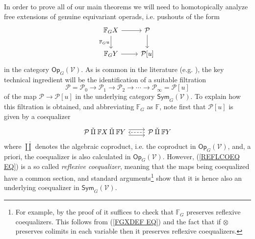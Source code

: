 \documentclass[a4paper,10pt]{article}%
\begin{document}
In order to prove all of our main theorems
we will need to homotopically analyze free extensions 
of genuine equivariant operads,
i.e. pushouts of the form
\begin{equation}
  \label{FREE_FG_EXT_EQ}
  \begin{tikzcd}
    \mathbb{F}_G X \ar{r} \ar{d}[swap]{\mathbb{F}_G u} & \mathcal{P} \ar{d}
    \\
    \mathbb{F}_G Y \ar{r} & \mathcal{P}[u]
  \end{tikzcd}
\end{equation}
in the category $\mathsf{Op}_G(\mathcal{V})$.
As is common in the literature (e.g. \cite{SS00, Spi01, BM03, Whi14, Pe16}),
the key technical ingredient will be the identification of a suitable filtration
\begin{equation}\label{FILTR EQ}
	\mathcal{P}=\mathcal{P}_0 \to 
	\mathcal{P}_1 \to \mathcal{P}_2 \to
	\cdots \to \mathcal{P}_{\infty}=\mathcal{P}[u]
\end{equation}
of the map $\mathcal{P} \to \mathcal{P}[u]$
in the underlying category $\mathsf{Sym}_G(\mathcal{V})$.
To explain how this filtration is obtained,
and abbreviating 
$\mathbb{F}_G$ as $\mathbb{F}$,
note first that $\mathcal{P}[u]$ is given by a coequalizer
\begin{equation}\label{REFLCOEQ EQ}
\begin{tikzcd}
	\mathcal{P} \mathbin{\check{\amalg}}
	\mathbb{F} X \mathbin{\check{\amalg}} \mathbb{F} Y
	\ar[shift right=4pt]{r} \ar[shift right=-4pt]{r}
&
	\mathcal{P} \mathbin{\check{\amalg}} \mathbb{F} Y 
	\ar[dashed]{l}
\end{tikzcd}
\end{equation}
where $\check{\amalg}$ denotes the algebraic coproduct, 
i.e. the coproduct in $\mathsf{Op}_G(\mathcal{V})$, and, a priori,
the coequalizer is also calculated in $\mathsf{Op}_G(\mathcal{V})$. However, (\ref{REFLCOEQ EQ}) is a so called \textit{reflexive coequalizer}, meaning that the maps being coequalized have a common section,
and standard arguments\footnote{
For example, by the proof of 
\cite[Prop. 3.27]{Ha09}
it suffices to check that 
$\mathbb{F}_G$ preserves reflexive coequalizers.
This follows from (\ref{FGXDEF EQ}) and the fact that if $\otimes$ preserves colimits in each variable then
it preserves reflexive coequalizers.}
 show that 
it is hence also an underlying coequalizer in 
$\mathsf{Sym}_G(\mathcal{V})$.
\end{document}
